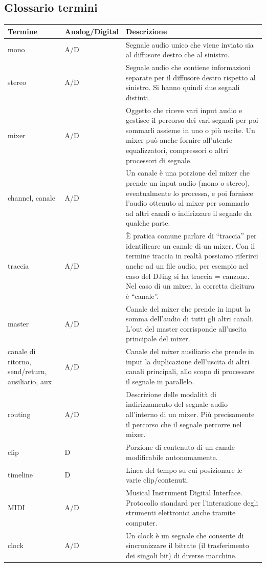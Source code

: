 \documentclass[a4paper,12pt]{report}
\begin{document}
\subsection{Glossario termini}
\begin{center}
\begin{longtable}{| m{5em} | m{3.2cm}| m{7cm} |} 
 \hline
 \textbf{Termine} & \textbf{Analog/Digital} & \textbf{Descrizione} \\ [0.5ex] 
 \hline
 mono & A/D & Segnale audio unico che viene inviato sia al diffusore destro che al sinistro. \\ 
 \hline
 stereo & A/D & Segnale audio che contiene informazioni separate per il diffusore destro rispetto al sinistro.
Si hanno quindi due segnali distinti. \\
 \hline
 mixer & A/D & Oggetto che riceve vari input audio e gestisce il percorso dei vari segnali  per poi sommarli assieme in uno o più uscite.
Un mixer può anche fornire all’utente equalizzatori, compressori o altri processori di segnale. \\
 \hline
 channel, canale & A/D & Un canale è una porzione del mixer che prende un input audio (mono o stereo), eventualmente lo processa, e poi fornisce l’audio ottenuto al mixer per sommarlo ad altri canali o indirizzare il segnale da qualche parte. \\
 \hline
 traccia & A/D & È pratica comune parlare di “traccia” per identificare un canale di un mixer. Con il termine traccia in realtà possiamo riferirci anche ad un file audio, per esempio nel caso del DJing si ha traccia = canzone. Nel caso di un mixer, la corretta dicitura è “canale”. \\ 
 \hline
 master & A/D & Canale del mixer che prende in input la somma dell’audio di tutti gli altri canali. L’out del master corrisponde all’uscita principale del mixer. \\
 \hline 
 canale di ritorno, send/return, ausiliario, aux & A/D & Canale del mixer ausiliario che prende in input la duplicazione dell’uscita di altri canali principali, allo scopo di processare il segnale in parallelo. \\
 \hline
 routing & A/D & Descrizione delle modalità di indirizzamento del segnale audio all’interno di un mixer. Più precisamente il percorso che il segnale percorre nel mixer. \\
 \hline
 clip & D & Porzione di contenuto di un canale modificabile autonomamente. \\
 \hline
 timeline & D & Linea del tempo su cui posizionare le varie clip/contenuti. \\
 \hline
 MIDI & A/D & Musical Instrument Digital Interface.
Protocollo standard per l’interazione degli strumenti elettronici anche tramite computer. \\
\hline
clock & A/D & Un clock è un segnale che consente di sincronizzare il bitrate (il trasferimento dei singoli bit) di diverse macchine. \\
\hline
\end{longtable}
\end{center}
\end{document}
